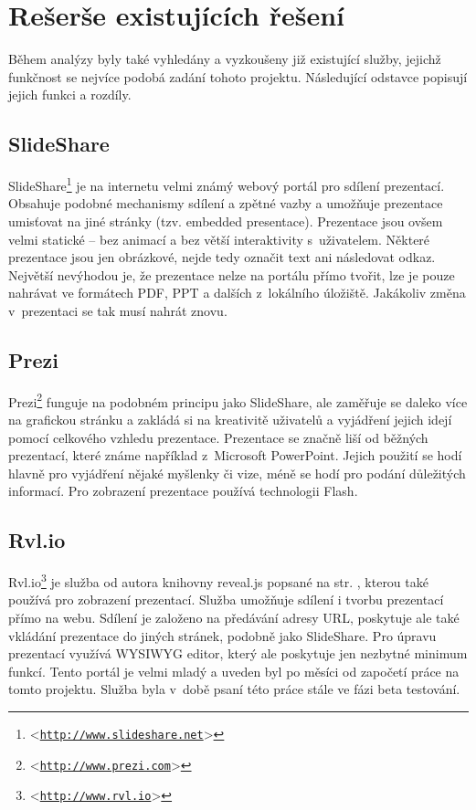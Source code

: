 \documentclass[11pt,twoside,a4paper]{book}
\let\oldUrl\url									%
\renewcommand\url[1]{<\texttt{\oldUrl{#1}}>}
\begin{document}
\section{Rešerše existujících řešení} \label{chap:existujiciSystemy}
Během analýzy byly také vyhledány a vyzkoušeny již existující služby, jejichž funkčnost se nejvíce podobá zadání tohoto projektu. Následující odstavce popisují jejich funkci a rozdíly.


\subsection{SlideShare}
SlideShare\footnote{\url{http://www.slideshare.net}} je na internetu velmi známý webový portál pro sdílení prezentací. Obsahuje podobné mechanismy sdílení a zpětné vazby a umožňuje prezentace umisťovat na jiné stránky (tzv. embedded presentace). Prezentace jsou ovšem velmi statické – bez animací a bez větší interaktivity s~uživatelem. Některé prezentace jsou jen obrázkové, nejde tedy označit text ani následovat odkaz. Největší nevýhodou je, že prezentace nelze na portálu přímo tvořit, lze je pouze nahrávat ve formátech PDF, PPT a dalších z~lokálního úložiště. Jakákoliv změna v~prezentaci se tak musí nahrát znovu.

\subsection{Prezi}
Prezi\footnote{\url{http://www.prezi.com}} funguje na podobném principu jako SlideShare, ale zaměřuje se daleko více na grafickou stránku a zakládá si na kreativitě uživatelů a vyjádření jejich idejí pomocí celkového vzhledu prezentace. Prezentace se značně liší od běžných prezentací, které známe například z~Microsoft PowerPoint. Jejich použití se hodí hlavně pro vyjádření nějaké myšlenky či vize, méně se hodí pro podání důležitých informací. Pro zobrazení prezentace používá technologii Flash.

\subsection{Rvl.io}
Rvl.io\footnote{\url{http://www.rvl.io}} je služba od autora knihovny reveal.js popsané na str. \pageref{chap:revealjs}, kterou také používá pro zobrazení prezentací. Služba umožňuje sdílení i tvorbu prezentací přímo na webu. Sdílení je založeno na předávání adresy URL, poskytuje ale také vkládání prezentace do jiných stránek, podobně jako SlideShare. Pro úpravu prezentací využívá WYSIWYG editor, který ale poskytuje jen nezbytné minimum funkcí. Tento portál je velmi mladý a uveden byl po měsíci od započetí práce na tomto projektu. Služba byla v~době psaní této práce stále ve fázi beta testování.
\end{document}
